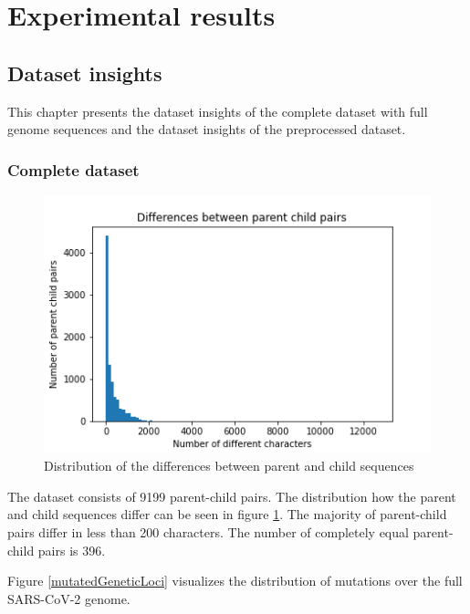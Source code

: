 \section{Experimental results} \label{experiments}

\subsection{Dataset insights}  \label{ch:experimentsA}

This chapter presents the dataset insights of the complete dataset with full genome sequences and the dataset insights of the preprocessed dataset.

\subsubsection{Complete dataset}  \label{ch:experimentsAa}

\begin{figure}
	\centering
	\includegraphics[width=0.9\linewidth]{figures/distributionDifferencesParentChild.png}
	\caption{Distribution of the differences between parent and child sequences \cite{own representation}}
	\label{distributionDifferencesParentChild}
\end{figure}

The dataset consists of 9199 parent-child pairs.
The distribution how the parent and child sequences differ can be seen in figure \ref{distributionDifferencesParentChild}. The majority of parent-child pairs differ in less than 200 characters. The number of completely equal parent-child pairs is 396.

\vspace{2cm}
Figure \ref{mutatedGeneticLoci} visualizes the distribution of mutations over the full \ac{SARS-CoV-2} genome.

